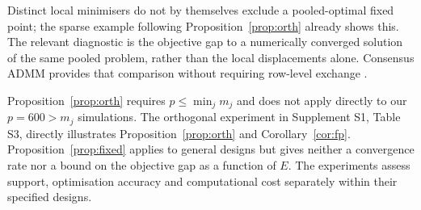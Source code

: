 Distinct local minimisers do not by themselves exclude a pooled-optimal
fixed point; the sparse example following Proposition~\ref{prop:orth}
already shows this. The relevant diagnostic is the objective gap to a
numerically converged solution of the same pooled problem, rather than
the local displacements alone. Consensus ADMM provides that comparison
without requiring row-level exchange \citep{boyd2011}.

\begin{remark}
Proposition~\ref{prop:orth} requires $p\le\min_jm_j$ and does not apply
directly to our $p=600>m_j$ simulations. The orthogonal experiment in
Supplement S1, Table S3, directly illustrates
Proposition~\ref{prop:orth} and Corollary~\ref{cor:fp}.
Proposition~\ref{prop:fixed}
applies to general designs but gives neither a convergence rate nor a
bound on the objective gap as a function of $E$. The experiments assess
support, optimisation accuracy and computational cost separately within
their specified designs.
\end{remark}
